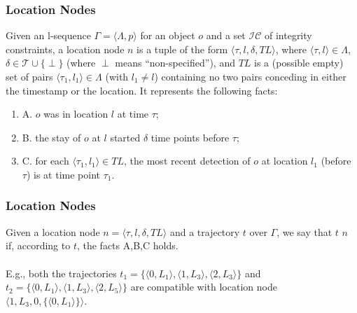 \begin{frame}
\frametitle{Location Nodes}

\begin{definition}
  Given an l-sequence $\Gamma = \langle \Lambda,p \rangle$ for an object $o$ and a set $\mathcal{IC}$ of integrity constraints, a location node $n$ is a tuple of the form $\langle \tau, l, \delta, TL \rangle$, where $\langle \tau, l \rangle \in \Lambda$, $\delta \in \mathcal{T} \cup \{ \perp \}$ (where $\perp$ means ``non-specified''), and $TL$ is a (possible empty) set of pairs $\langle \tau_1, l_1 \rangle \in \Lambda$ (with $l_1 \neq l$) containing no two pairs conceding in either the timestamp or the location. It represents the following facts:
  \begin{enumerate}
    \item A. $o$ was in location $l$ at time $\tau$;
    \item B. the stay of $o$ at $l$ started $\delta$ time points before $\tau$;
    \item C. for each $\langle \tau_1, l_1 \rangle \in TL$, the most recent detection of $o$ at location $l_1$ (before $\tau$) is at time point $\tau_1$.
  \end{enumerate}
\end{definition}

\end{frame}


\begin{frame}
\frametitle{Location Nodes}

Given a location node $n = \langle \tau, l, \delta, TL \rangle$ and a trajectory $t$ over $\Gamma$, we say that $t$  $n$ if, according to $t$, the facts A,B,C holds.\\~\\

E.g., both the trajectories $t_1 = \{ \langle 0,L_1 \rangle, \langle 1,L_3 \rangle, \langle 2,L_3 \rangle \}$ and $t_2 = \{ \langle 0,L_1 \rangle, \langle 1,L_3 \rangle, \langle 2,L_5 \rangle \}$ are compatible with location node $\langle 1, L_3, 0, \{ \langle 0, L_1 \rangle \} \rangle$.

\end{frame}


